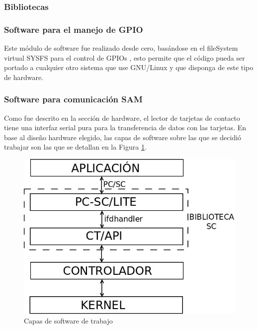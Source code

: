 \documentclass[%
        final,
        notitlepage,
        narroweqnarray,
        inline,
        ]{ieee}
\begin{document}
\subsubsection{Bibliotecas}

\subsubsection*{Software para el manejo de GPIO}

Este módulo de software fue realizado desde cero, basándose en el fileSystem virtual SYSFS para el control de GPIOs \cite{gpio} \cite{gpioK}, esto permite que el código pueda ser portado a cualquier otro sistema que use GNU/Linux y que disponga de este tipo de hardware.

\bigskip
\subsubsection*{Software para comunicación SAM}

Como fue descrito en la sección de hardware, el lector de tarjetas de contacto tiene una interfaz serial pura para la transferencia de datos con las tarjetas. En base al diseño hardware elegido, las capas de software sobre las que se decidió trabajar son las que se detallan en la Figura \ref{Fig:capas}. 

\begin{figure}[h]
\centering
  \begin{center}
  \includegraphics[scale=.35]{../docs/Imagenes/SW_sc1.jpg} 
  \end{center}
  \caption{Capas de software de trabajo}\label{Fig:capas} 
\end{figure}
\end{document}
